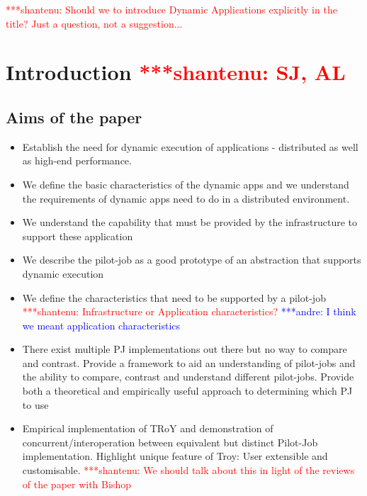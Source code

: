 \documentclass[conference,final]{IEEEtran}
\newcommand{\jhanote}[1]{ {\textcolor{red} { ***shantenu: #1 }}}
\newcommand{\alnote}[1]{ {\textcolor{blue} { ***andre: #1 }}}
\newcommand{\alnote}[1]{}
\newcommand{\jhanote}[1]{}
\begin{document}
\jhanote{Should we to introduce Dynamic Applications explicitly in the
  title? Just a question, not a suggestion...}



\section{Introduction \jhanote{SJ, AL}}


\subsection{Aims of the paper}
\begin{itemize}

\item Establish the need for dynamic execution of applications -
  distributed as well as high-end performance.

\item We define the basic characteristics of the dynamic apps and we
  understand the requirements of dynamic apps need to do in a
  distributed environment.

\item We understand the capability that must be provided by the
  infrastructure to support these application

\item We describe the pilot-job as a good prototype of an abstraction
  that supports dynamic execution

\item We define the characteristics that need to be supported by a
  pilot-job \jhanote{Infrastructure or Application characteristics?}
  \alnote{I think we meant application characteristics}

\item There exist multiple PJ implementations out there but no way to
  compare and contrast. Provide a framework to aid an understanding of
  pilot-jobs and the ability to compare, contrast and understand
  different pilot-jobs.  Provide both a theoretical and empirically
  useful approach to determining which PJ to use


\item Empirical implementation of TRoY and demonstration of
  concurrent/interoperation between equivalent but distinct Pilot-Job
  implementation. Highlight unique feature of Troy: User extensible
  and customisable. \jhanote{We should talk about this in light of the
    reviews of the paper with Bishop}
\end{itemize}
\end{document}
